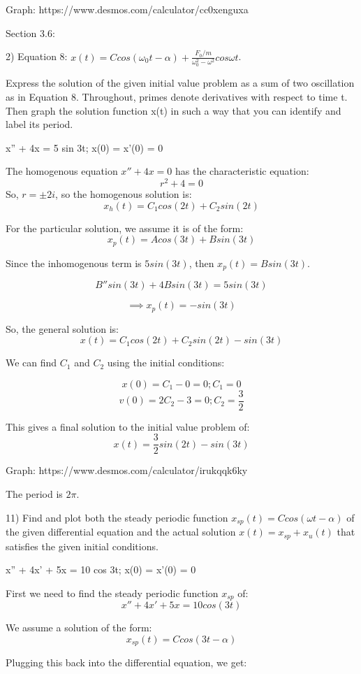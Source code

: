 \documentclass{article}
\begin{document}
Graph: https://www.desmos.com/calculator/cc0xenguxa


Section 3.6:

2) Equation 8: $x(t) = C cos(\omega_0 t - \alpha) + \frac{F_0/m}{\omega_0^2 - \omega^2} cos \omega t$.

Express the solution of the given initial value problem as a sum of two oscillation as in Equation 8.
Throughout, primes denote derivatives with respect to time t. Then graph the solution function x(t)
in such a way that you can identify and label its period.

x'' + 4x = 5 sin 3t; x(0) = x'(0) = 0

The homogenous equation $x'' + 4x = 0$ has the characteristic equation:
\[r^2 + 4 = 0\]
So, $r = \pm 2i$, so the homogenous solution is:
\[x_h(t) = C_1 cos(2t) + C_2 sin(2t)\]

For the particular solution, we assume it is of the form:
\[x_p(t) = A cos(3t) + B sin(3t)\]

Since the inhomogenous term is $5 sin(3t)$, then
$x_p(t) = B sin(3t)$.

\[B'' sin(3t) + 4B sin(3t) = 5 sin(3t)\]

\[\implies x_p(t) = -sin(3t)\]

So, the general solution is:
\[x(t) = C_1 cos(2t) + C_2 sin(2t) - sin(3t)\]

We can find $C_1$ and $C_2$ using the initial conditions:

\[x(0) = C_1 - 0 = 0; C_1 = 0\]
\[v(0) = 2C_2 - 3 = 0; C_2 = \frac{3}{2}\]

This gives a final solution to the initial value problem of:
\[x(t) = \frac{3}{2} sin(2t) - sin(3t)\]


Graph: https://www.desmos.com/calculator/irukqqk6ky

The period is $2 \pi$.


11) Find and plot both the steady periodic function $x_{sp}(t) = C cos(\omega t - \alpha)$ of the
given differential equation and the actual solution $x(t) = x_{sp} + x_{u}(t)$ that
satisfies the given initial conditions.

x'' + 4x' + 5x = 10 cos 3t; x(0) = x'(0) = 0

First we need to find the steady periodic function $x_{sp}$ of:
\[x'' + 4x' + 5x = 10cos(3t)\]

We assume a solution of the form:
\[x_{sp}(t) = C cos(3t - \alpha)\]

Plugging this back into the differential equation, we get:
\end{document}
